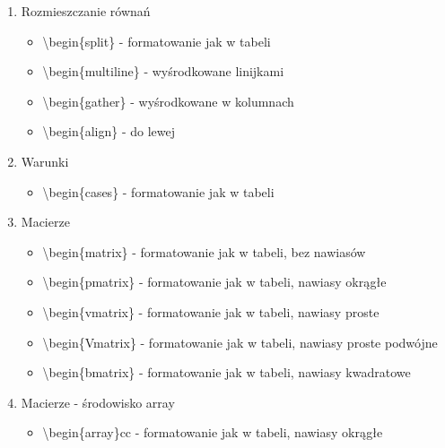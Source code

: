 \documentclass[a4paper,twoside,onecolumn]{report}
\begin{document}
\begin{enumerate}
			\item Rozmieszczanie równań
			\begin{itemize}
				\item \textbackslash begin\{split\} - formatowanie jak w tabeli
				\item \textbackslash begin\{multiline\} - wyśrodkowane linijkami
				\item \textbackslash begin\{gather\} - wyśrodkowane w kolumnach
				\item \textbackslash begin\{align\} - do lewej
			\end{itemize}

			\item Warunki
			\begin{itemize}
				\item \textbackslash begin\{cases\} - formatowanie jak w tabeli
			\end{itemize}

			\item Macierze
			\begin{itemize}
				\item \textbackslash begin\{matrix\} - formatowanie jak w tabeli, bez nawiasów
				\item \textbackslash begin\{pmatrix\} - formatowanie jak w tabeli, nawiasy okrągłe
				\item \textbackslash begin\{vmatrix\} - formatowanie jak w tabeli, nawiasy proste
				\item \textbackslash begin\{Vmatrix\} - formatowanie jak w tabeli, nawiasy proste podwójne
				\item \textbackslash begin\{bmatrix\} - formatowanie jak w tabeli, nawiasy kwadratowe
			\end{itemize}

			\item Macierze - środowisko array
			\begin{itemize}
				\item \textbackslash begin\{array\}{cc} - formatowanie jak w tabeli, nawiasy okrągłe
			\end{itemize}


\end{enumerate}
\end{document}
